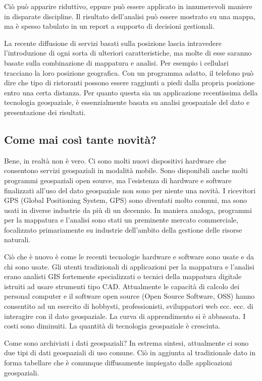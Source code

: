 Ciò può apparire riduttivo, eppure può essere applicato in innumerevoli
maniere in disparate discipline. Il risultato dell'analisi può essere
mostrato su una mappa, ma è spesso tabulato in un report a supporto
di decisioni gestionali.

La recente diffusione di servizi basati sulla posizione lascia intravedere
l'introduzione di ogni sorta di ulteriori caratteristiche, ma molte
di esse saranno basate sulla combinazione di mappatura e analisi.
Per esempio i cellulari tracciano la loro posizione geografica. Con
un programma adatto, il telefono può dire che tipo di ristoranti possono
essere raggiunti a piedi dalla propria posizione entro una certa distanza.
Per quanto questa sia un applicazione recentissima della tecnologia geospaziale,
è essenzialmente basata su analisi geospaziale del dato e presentazione
dei risultati.

\subsection{Come mai così tante novità?}\label{label_whynew}

Bene, in realtà non è vero. Ci sono molti nuovi dispositivi hardware
che consentono servizi geospaziali in modalità mobile. Sono disponibili
anche molti programmi geospaziali open source, ma l'esistenza di hardware
e software finalizzati all'uso del dato geospaziale non sono per niente una
novità. I ricevitori GPS (Global Positioning System, GPS) sono diventati
molto comuni, ma sono usati in diverse industrie da più di un decennio.
In maniera analoga, programmi per la mappatura e l'analisi sono stati
un preminente mercato commerciale, focalizzato primariamente su industrie
dell'ambito della gestione delle risorse naturali.

Ciò che è nuovo è come le recenti tecnologie hardware e software sono
usate e da chi sono usate. Gli utenti tradizionali di applicazioni
per la mappatura e l'analisi erano analisti GIS fortemente specializzati
o tecnici della mappatura digitale istruiti ad usare strumenti tipo
CAD. Attualmente le capacità di calcolo dei personal computer e il software
open source (Open Source Software, OSS) hanno consentito ad un esercito
di hobbysti, professionisti, sviluppatori web ecc. ecc. di interagire
con il dato geospaziale. La curva di apprendimento si è abbassata.
I costi sono diminuiti. La quantità di tecnologia geospaziale è cresciuta.

Come sono archiviati i dati geospaziali? In estrema sintesi, attualmente ci sono
due tipi di dati geospaziali di uso comune. Ciò in aggiunta
al tradizionale dato in forma tabellare che è comunque diffusamente
impiegato dalle applicazioni geospaziali.

